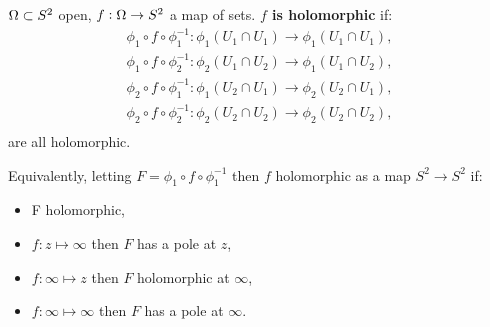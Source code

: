 \begin{definition}

$\Omega \subset S^2$ open, $f:\Omega \to S^2$ a map of sets. \textbf{$f$ is holomorphic} if:
\begin{align*}
    \phi_1 \circ f \circ \phi_1^{-1} : \phi_1 \left( U_1 \cap U_1 \right) \to \phi_1 \left( U_1 \cap U_1\right),\\
    \phi_1 \circ f \circ \phi_2^{-1} : \phi_2 \left( U_1 \cap U_2 \right) \to \phi_1 \left( U_1 \cap U_2\right),\\
    \phi_2 \circ f \circ \phi_1^{-1} : \phi_1 \left( U_2 \cap U_1 \right) \to \phi_2 \left( U_2 \cap U_1\right),\\
    \phi_2 \circ f \circ \phi_2^{-1} : \phi_2 \left( U_2 \cap U_2 \right) \to \phi_2 \left( U_2 \cap U_2\right),\\
\end{align*}
are all holomorphic.

Equivalently, letting $F= \phi_1 \circ f \circ \phi_1^{-1}$ then $f$ holomorphic as a map $S^2 \to S^2$ if:
\begin{itemize}
    \item F holomorphic,
    \item $f:z \mapsto \infty$ then $F$ has a pole at $z$,
    \item $f:\infty \mapsto z$ then $F$ holomorphic at $\infty$,
    \item $f: \infty \mapsto \infty$ then $F$ has a pole at $\infty$.
\end{itemize}
\end{definition}










